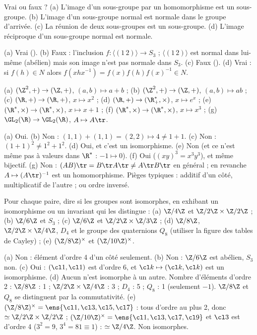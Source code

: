 \begin{exo}
Vrai ou faux ? (a) L'image d'un sous-groupe par un homomorphisme est un sous-groupe. (b) L'image d'un sous-groupe normal est normale dans le groupe d'arrivée. (c) La réunion de deux sous-groupes est un sous-groupe. (d) L'image réciproque d'un sous-groupe normal est normale.
\begin{corrige}
(a) Vrai (). (b) Faux : l'inclusion $f:\langle(1\,2)\rangle\to S_3$ ; $\langle(1\,2)\rangle$ est normal dans lui-même (abélien) mais son image n'est pas normale dans $S_3$. (c) Faux (). (d) Vrai : si $f(h)\in N$ alors $f(xhx^{-1})=f(x)f(h)f(x)^{-1}\in N$.
\end{corrige}
\end{exo}
\begin{exo}
(a) $(\Z^2,+)\to(\Z,+)$, $(a,b)\mapsto a+b$ ; (b) $(\Z^2,+)\to(\Z,+)$, $(a,b)\mapsto ab$ ; (c) $(\R,+)\to(\R,+)$, $x\mapsto x^2$ ; (d) $(\R,+)\to(\R_+^*,\times)$, $x\mapsto e^x$ ; (e) $(\R^*,\times)\to(\R^*,\times)$, $x\mapsto x+1$ ; (f) $(\R^*,\times)\to(\R^*,\times)$, $x\mapsto x^3$ ; (g) $\GL_2(\R)\to\GL_2(\R)$, $A\mapsto A\tr$.
\begin{corrige}
(a) Oui. (b) Non : $(1,1)+(1,1)=(2,2)\mapsto4\neq1+1$. (c) Non : $(1+1)^2\neq1^2+1^2$. (d) Oui, et c'est un isomorphisme. (e) Non (et ce n'est même pas à valeurs dans $\R^*$ : $-1\mapsto0$). (f) Oui ($(xy)^3=x^3y^3$), et même bijectif. (g) Non : $(AB)\tr=B\tr A\tr\neq A\tr B\tr$ en général ; en revanche $A\mapsto(A\tr)^{-1}$ est un homomorphisme. Pièges typiques : additif d'un côté, multiplicatif de l'autre ; ou ordre inversé.
\end{corrige}
\end{exo}
\begin{exo}
Pour chaque paire, dire si les groupes sont isomorphes, en exhibant un isomorphisme ou un invariant qui les distingue : (a) $\Z/4\Z$ et $\Z/2\Z\times\Z/2\Z$ ; (b) $\Z/6\Z$ et $S_3$ ; (c) $\Z/6\Z$ et $\Z/2\Z\times\Z/3\Z$ ; (d) $\Z/8\Z$, $\Z/2\Z\times\Z/4\Z$, $D_4$ et le groupe des quaternions $Q_8$ (utiliser la figure des tables de Cayley) ; (e) $(\Z/8\Z)^\times$ et $(\Z/10\Z)^\times$.
\begin{corrige}
(a) Non : élément d'ordre 4 d'un côté seulement. (b) Non : $\Z/6\Z$ est abélien, $S_3$ non. (c) Oui : $(\cl1,\cl1)$ est d'ordre 6, et $\cl k\mapsto(\cl k,\cl k)$ est un isomorphisme. (d) Aucun n'est isomorphe à un autre. Nombre d'éléments d'ordre 2 : $\Z/8\Z$ : 1 ; $\Z/2\Z\times\Z/4\Z$ : 3 ; $D_4$ : 5 ; $Q_8$ : 1 (seulement $-1$). $\Z/8\Z$ et $Q_8$ se distinguent par la commutativité. (e) $(\Z/8\Z)^\times=\ens{\cl1,\cl3,\cl5,\cl7}$ : tous d'ordre au plus 2, donc $\simeq\Z/2\Z\times\Z/2\Z$ ; $(\Z/10\Z)^\times=\ens{\cl1,\cl3,\cl7,\cl9}$ et $\cl3$ est d'ordre 4 ($3^2=9$, $3^4=81\equiv1$) : $\simeq\Z/4\Z$. Non isomorphes.
\end{corrige}
\end{exo}
